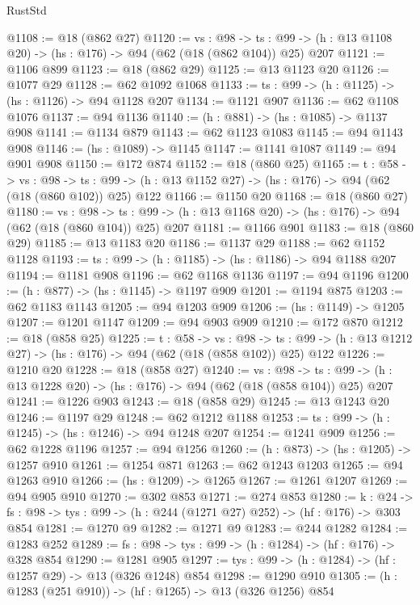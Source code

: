 \begin{lexlean}{RustStd}
\begin{coremodule}
@1108 := @18 (@862 @27)
@1120 := {vs : @98} ->
  {ts : @99} -> (h : @13 @1108 @20) -> (hs : @176) -> @94 (@62 (@18 (@862 @104)) @25) @207
@1121 := @1106 @899
@1123 := @18 (@862 @29)
@1125 := @13 @1123 @20
@1126 := @1077 @29
@1128 := @62 @1092 @1068
@1133 := {ts : @99} -> (h : @1125) -> (hs : @1126) -> @94 @1128 @207
@1134 := @1121 @907
@1136 := @62 @1108 @1076
@1137 := @94 @1136
@1140 := (h : @881) -> (hs : @1085) -> @1137 @908
@1141 := @1134 @879
@1143 := @62 @1123 @1083
@1145 := @94 @1143 @908
@1146 := (hs : @1089) -> @1145
@1147 := @1141 @1087
@1149 := @94 @901 @908
@1150 := @172 @874
@1152 := @18 (@860 @25)
@1165 := {t : @58} ->
  {vs : @98} ->
  {ts : @99} -> (h : @13 @1152 @27) -> (hs : @176) -> @94 (@62 (@18 (@860 @102)) @25) @122
@1166 := @1150 @20
@1168 := @18 (@860 @27)
@1180 := {vs : @98} ->
  {ts : @99} -> (h : @13 @1168 @20) -> (hs : @176) -> @94 (@62 (@18 (@860 @104)) @25) @207
@1181 := @1166 @901
@1183 := @18 (@860 @29)
@1185 := @13 @1183 @20
@1186 := @1137 @29
@1188 := @62 @1152 @1128
@1193 := {ts : @99} -> (h : @1185) -> (hs : @1186) -> @94 @1188 @207
@1194 := @1181 @908
@1196 := @62 @1168 @1136
@1197 := @94 @1196
@1200 := (h : @877) -> (hs : @1145) -> @1197 @909
@1201 := @1194 @875
@1203 := @62 @1183 @1143
@1205 := @94 @1203 @909
@1206 := (hs : @1149) -> @1205
@1207 := @1201 @1147
@1209 := @94 @903 @909
@1210 := @172 @870
@1212 := @18 (@858 @25)
@1225 := {t : @58} ->
  {vs : @98} ->
  {ts : @99} -> (h : @13 @1212 @27) -> (hs : @176) -> @94 (@62 (@18 (@858 @102)) @25) @122
@1226 := @1210 @20
@1228 := @18 (@858 @27)
@1240 := {vs : @98} ->
  {ts : @99} -> (h : @13 @1228 @20) -> (hs : @176) -> @94 (@62 (@18 (@858 @104)) @25) @207
@1241 := @1226 @903
@1243 := @18 (@858 @29)
@1245 := @13 @1243 @20
@1246 := @1197 @29
@1248 := @62 @1212 @1188
@1253 := {ts : @99} -> (h : @1245) -> (hs : @1246) -> @94 @1248 @207
@1254 := @1241 @909
@1256 := @62 @1228 @1196
@1257 := @94 @1256
@1260 := (h : @873) -> (hs : @1205) -> @1257 @910
@1261 := @1254 @871
@1263 := @62 @1243 @1203
@1265 := @94 @1263 @910
@1266 := (hs : @1209) -> @1265
@1267 := @1261 @1207
@1269 := @94 @905 @910
@1270 := @302 @853
@1271 := @274 @853
@1280 := {k : @24} ->
  {fs : @98} -> {tys : @99} -> (h : @244 (@1271 @27) @252) -> (hf : @176) -> @303 @854
@1281 := @1270 @9
@1282 := @1271 @9
@1283 := @244 @1282
@1284 := @1283 @252
@1289 := {fs : @98} -> {tys : @99} -> (h : @1284) -> (hf : @176) -> @328 @854
@1290 := @1281 @905
@1297 := {tys : @99} -> (h : @1284) -> (hf : @1257 @29) -> @13 (@326 @1248) @854
@1298 := @1290 @910
@1305 := (h : @1283 (@251 @910)) -> (hf : @1265) -> @13 (@326 @1256) @854

\end{coremodule}
\end{lexlean}
